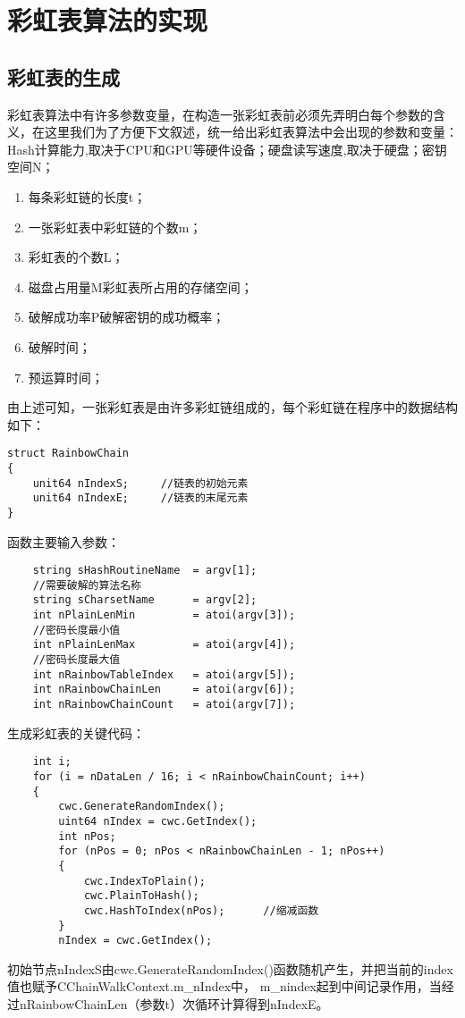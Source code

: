 \chapter{彩虹表算法的实现}
\section{彩虹表的生成}
彩虹表算法中有许多参数变量，在构造一张彩虹表前必须先弄明白每个参数的含义，在这里我们为了方便下文叙述，统一给出彩虹表算法中会出现的参数和变量：Hash计算能力,取决于CPU和GPU等硬件设备；硬盘读写速度,取决于硬盘；密钥空间N；
\begin{enumerate}
\item 每条彩虹链的长度t；
\item 一张彩虹表中彩虹链的个数m；
\item 彩虹表的个数L；
\item 磁盘占用量M\quad 彩虹表所占用的存储空间；
\item 破解成功率P\quad 破解密钥的成功概率；
\item 破解时间；
\item 预运算时间；
\end{enumerate}
由上述可知，一张彩虹表是由许多彩虹链组成的，每个彩虹链在程序中的数据结构如下：\\
\begin{lstlisting}
struct RainbowChain 
{
	unit64 nIndexS;		//链表的初始元素
	unit64 nIndexE;		//链表的末尾元素
}
\end{lstlisting}
函数主要输入参数：
\begin{lstlisting}
	string sHashRoutineName  = argv[1];	
	//需要破解的算法名称
	string sCharsetName      = argv[2];				
	int nPlainLenMin         = atoi(argv[3]);
	//密码长度最小值
	int nPlainLenMax         = atoi(argv[4]);
	//密码长度最大值
	int nRainbowTableIndex   = atoi(argv[5]);			
	int nRainbowChainLen     = atoi(argv[6]);			
	int nRainbowChainCount   = atoi(argv[7]);			
\end{lstlisting}
生成彩虹表的关键代码：
\begin{lstlisting}
	int i;
	for (i = nDataLen / 16; i < nRainbowChainCount; i++) 
	{
		cwc.GenerateRandomIndex();
		uint64 nIndex = cwc.GetIndex();
		int nPos;
		for (nPos = 0; nPos < nRainbowChainLen - 1; nPos++)
		{
			cwc.IndexToPlain();
			cwc.PlainToHash();
			cwc.HashToIndex(nPos);		//缩减函数
		}
		nIndex = cwc.GetIndex();

\end{lstlisting}

初始节点nIndexS由cwc.GenerateRandomIndex()函数随机产生，并把当前的index值也赋予CChainWalkContext.m\_nIndex中， m\_nindex起到中间记录作用，当经过nRainbowChainLen（参数t）次循环计算得到nIndexE。


